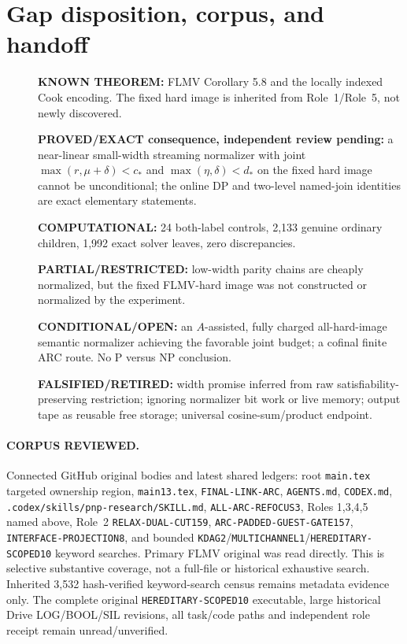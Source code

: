 \documentclass[11pt]{article}
\begin{document}
\section{Gap disposition, corpus, and handoff}
\begin{description}
\item[] \textbf{KNOWN THEOREM:} FLMV Corollary 5.8 and the locally
indexed Cook encoding. The fixed hard image is inherited from
Role~1/Role~5, not newly discovered.
\item[] \textbf{PROVED/EXACT consequence, independent review pending:}
a near-linear small-width streaming normalizer with joint
$\max(r,\mu+\delta)<c_*$ and
$\max(\eta,\delta)<d_*$ on the fixed hard image cannot be
unconditional; the online DP and two-level named-join
identities are exact elementary statements.
\item[] \textbf{COMPUTATIONAL:} 24 both-label controls, 2,133 genuine
ordinary children, 1,992 exact solver leaves, zero discrepancies.
\item[] \textbf{PARTIAL/RESTRICTED:} low-width parity chains are
cheaply normalized, but the fixed FLMV-hard image was not
constructed or normalized by the experiment.
\item[] \textbf{CONDITIONAL/OPEN:} an $A$-assisted, fully charged
all-hard-image semantic normalizer achieving the favorable
joint budget; a cofinal finite ARC route. No P versus NP conclusion.
\item[] \textbf{FALSIFIED/RETIRED:} width promise inferred from raw
satisfiability-preserving restriction; ignoring normalizer bit
work or live memory; output tape as reusable free storage;
universal cosine-sum/product endpoint.
\end{description}

\paragraph{CORPUS REVIEWED.} Connected GitHub original bodies and
latest shared ledgers: root \texttt{main.tex} targeted ownership
region, \texttt{main13.tex}, \texttt{FINAL-LINK-ARC},
\texttt{AGENTS.md}, \texttt{CODEX.md},
\texttt{.codex/skills/pnp-research/SKILL.md},
\texttt{ALL-ARC-REFOCUS3}, Roles 1,3,4,5 named above,
Role~2 \texttt{RELAX-DUAL-CUT159}, \texttt{ARC-PADDED-GUEST-GATE157},
\texttt{INTERFACE-PROJECTION8}, and bounded
\texttt{KDAG2}/\texttt{MULTICHANNEL1}/\texttt{HEREDITARY-SCOPED10}
keyword searches. Primary FLMV original was read directly.
This is selective substantive coverage, not a full-file or
historical exhaustive search. Inherited 3,532 hash-verified
keyword-search census remains metadata evidence only.
The complete original \texttt{HEREDITARY-SCOPED10} executable,
large historical Drive LOG/BOOL/SIL revisions, all task/code
paths and independent role receipt remain unread/unverified.
\end{document}
